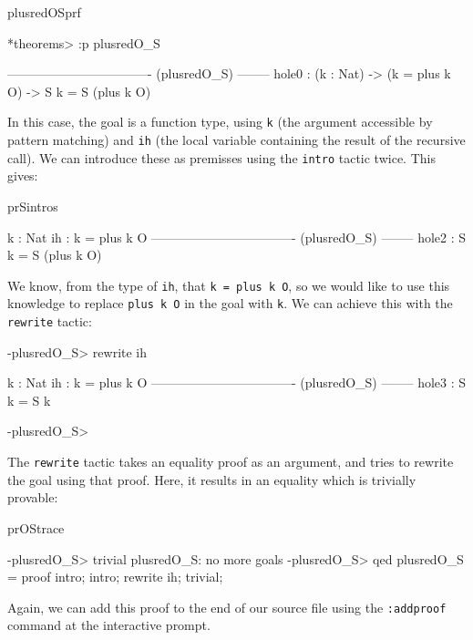 \begin{SaveVerbatim}{plusredOSprf}

*theorems> :p plusredO_S 

---------------------------------- (plusredO_S) --------
{hole0} : (k : Nat) -> (k = plus k O) -> S k = S (plus k O)

\end{SaveVerbatim}

\noindent
In this case, the goal is a function type, using \texttt{k} (the argument accessible by
pattern matching) and \texttt{ih} (the local variable containing the result of
the recursive call). We can introduce these as premisses using the \texttt{intro} tactic
twice. This gives:

\begin{SaveVerbatim}{prSintros}

  k : Nat
  ih : k = plus k O
---------------------------------- (plusredO_S) --------
{hole2} : S k = S (plus k O)

\end{SaveVerbatim}

\noindent
We know, from the type of \texttt{ih}, that \texttt{k = plus k O}, so we would like to
use this knowledge to replace \texttt{plus k O} in the goal with \texttt{k}. We can
achieve this with the \texttt{rewrite} tactic:

\begin{SaveVerbatim}{}

-plusredO_S> rewrite ih 

  k : Nat
  ih : k = plus k O
---------------------------------- (plusredO_S) --------
{hole3} : S k = S k

-plusredO_S>  

\end{SaveVerbatim}
\useverb{}

\noindent
The \texttt{rewrite} tactic takes an equality proof as an argument, and tries to rewrite
the goal using that proof. Here, it results in an equality which is trivially provable:

\begin{SaveVerbatim}{prOStrace}

-plusredO_S> trivial 
plusredO_S: no more goals
-plusredO_S> qed 
plusredO_S = proof {
    intro;
    intro;
    rewrite ih;
    trivial;
}

\end{SaveVerbatim}

\noindent
Again, we can add this proof to the end of our source file using the \texttt{:addproof}
command at the interactive prompt.
